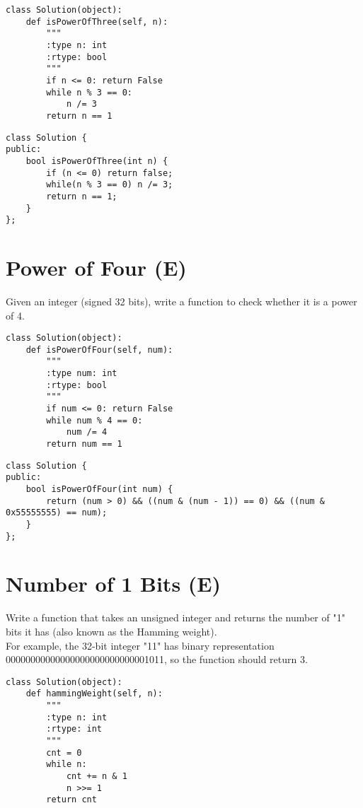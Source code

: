 \begin{lstlisting}
class Solution(object):
    def isPowerOfThree(self, n):
        """
        :type n: int
        :rtype: bool
        """
        if n <= 0: return False
        while n % 3 == 0:
            n /= 3
        return n == 1
\end{lstlisting}

\begin{lstlisting}
class Solution {
public:
    bool isPowerOfThree(int n) {
        if (n <= 0) return false;
        while(n % 3 == 0) n /= 3;
        return n == 1;
    }
};
\end{lstlisting}


\section{Power of Four (E)}
Given an integer (signed 32 bits), write a function to check whether it is a power of 4. \\

\begin{lstlisting}
class Solution(object):
    def isPowerOfFour(self, num):
        """
        :type num: int
        :rtype: bool
        """
        if num <= 0: return False
        while num % 4 == 0:
            num /= 4
        return num == 1        
\end{lstlisting}

\begin{lstlisting}
class Solution {
public:
    bool isPowerOfFour(int num) {
        return (num > 0) && ((num & (num - 1)) == 0) && ((num & 0x55555555) == num);
    }
};
\end{lstlisting}


\section{Number of 1 Bits (E)}
Write a function that takes an unsigned integer and returns the number of "1" bits it has (also known as the Hamming weight).\\

For example, the 32-bit integer "11" has binary representation 00000000000000000000000000001011, so the function should return 3.\\

\begin{lstlisting}
class Solution(object):
    def hammingWeight(self, n):
        """
        :type n: int
        :rtype: int
        """
        cnt = 0
        while n:
            cnt += n & 1
            n >>= 1
        return cnt
\end{lstlisting}

